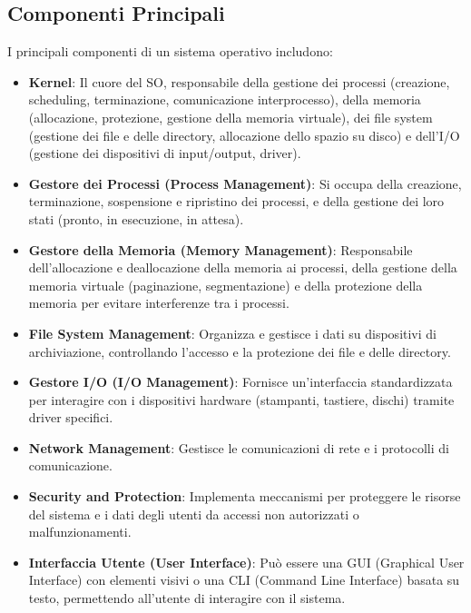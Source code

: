 \subsection{Componenti Principali}
I principali componenti di un sistema operativo includono:
\begin{itemize}
    \item \textbf{Kernel}: Il cuore del SO, responsabile della gestione dei processi (creazione, scheduling, terminazione, comunicazione interprocesso), della memoria (allocazione, protezione, gestione della memoria virtuale), dei file system (gestione dei file e delle directory, allocazione dello spazio su disco) e dell'I/O (gestione dei dispositivi di input/output, driver).
    \item \textbf{Gestore dei Processi (Process Management)}: Si occupa della creazione, terminazione, sospensione e ripristino dei processi, e della gestione dei loro stati (pronto, in esecuzione, in attesa).
    \item \textbf{Gestore della Memoria (Memory Management)}: Responsabile dell'allocazione e deallocazione della memoria ai processi, della gestione della memoria virtuale (paginazione, segmentazione) e della protezione della memoria per evitare interferenze tra i processi.
    \item \textbf{File System Management}: Organizza e gestisce i dati su dispositivi di archiviazione, controllando l'accesso e la protezione dei file e delle directory.
    \item \textbf{Gestore I/O (I/O Management)}: Fornisce un'interfaccia standardizzata per interagire con i dispositivi hardware (stampanti, tastiere, dischi) tramite driver specifici.
    \item \textbf{Network Management}: Gestisce le comunicazioni di rete e i protocolli di comunicazione.
    \item \textbf{Security and Protection}: Implementa meccanismi per proteggere le risorse del sistema e i dati degli utenti da accessi non autorizzati o malfunzionamenti.
    \item \textbf{Interfaccia Utente (User Interface)}: Può essere una GUI (Graphical User Interface) con elementi visivi o una CLI (Command Line Interface) basata su testo, permettendo all'utente di interagire con il sistema.
\end{itemize}

